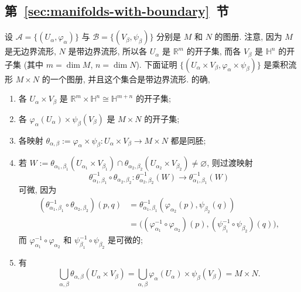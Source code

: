 \subsection{\texorpdfstring{第~\ref{sec:manifolds-with-boundary}~节}{带边界流形}}\label{subsec:solutions-manifolds-with-boundary}

\begin{description}[font=\normalfont,leftmargin=2em,labelwidth=1.5em]
设 $\mathcal{A}=\{(U_\alpha,\varphi_\alpha)\}$ 与 $\mathcal{B}=\{(V_\beta,\psi_\beta)\}$ 分别是 $M$ 和 $N$ 的图册. 注意, 因为 $M$ 是无边界流形, $N$ 是带边界流形, 所以各 $U_\alpha$ 是 $\mathbb{R}^m$ 的开子集, 而各 $V_\beta$ 是 $\mathbb{H}^n$ 的开子集 (其中 $m=\dim M$, $n=\dim N$). 下面证明 $\{(U_\alpha\times V_\beta,\varphi_\alpha\times\psi_\beta)\}$ 是乘积流形 $M\times N$ 的一个图册, 并且这个集合是带边界流形. 的确,
\begin{enumerate}[label=(\alph*),ref=\alph*,leftmargin=*]
\item 各 $U_\alpha\times V_\beta$ 是 $\mathbb{R}^m\times\mathbb{H}^n\cong\mathbb{H}^{m+n}$ 的开子集;
\item 各 $\varphi_\alpha(U_\alpha)\times\psi_\beta(V_\beta)$ 是 $M\times N$ 的开子集;
\item 各映射 $\theta_{\alpha,\beta}:=\varphi_\alpha\times\psi_\beta:U_\alpha\times V_\beta\to M\times N$ 都是同胚;
\item 若 $W:=\theta_{\alpha_1,\beta_1}(U_{\alpha_1}\times V_{\beta_1})\cap\theta_{\alpha_2,\beta_2}(U_{\alpha_2}\times V_{\beta_2})\ne\varnothing$, 则过渡映射
\[
  \theta_{\alpha_1,\beta_1}^{-1}\circ\theta_{\alpha_2,\beta_2}:
  \theta_{\alpha_2,\beta_2}^{-1}(W)\to\theta_{\alpha_1,\beta_1}^{-1}(W)
\]
可微, 因为
\begin{align*}
  (\theta_{\alpha_1,\beta_1}^{-1}\circ\theta_{\alpha_2,\beta_2})(p,q)
  &=\theta_{\alpha_1,\beta_1}^{-1}(\varphi_{\alpha_2}(p),\psi_{\beta_2}(q))\\
  &=\bigl((\varphi_{\alpha_1}^{-1}\circ\varphi_{\alpha_2})(p),(\psi_{\beta_1}^{-1}\circ\psi_{\beta_2})(q)\bigr),
\end{align*}
而 $\varphi_{\alpha_1}^{-1}\circ\varphi_{\alpha_2}$ 和 $\psi_{\beta_1}^{-1}\circ\psi_{\beta_2}$ 是可微的;
\item 有
\[
  \bigcup_{\alpha,\beta}\theta_{\alpha,\beta}(U_\alpha\times V_\beta)
  =\bigcup_{\alpha,\beta}\varphi_\alpha(U_\alpha)\times\psi_\beta(V_\beta)=M\times N.
\]
\end{enumerate}

\end{description}
